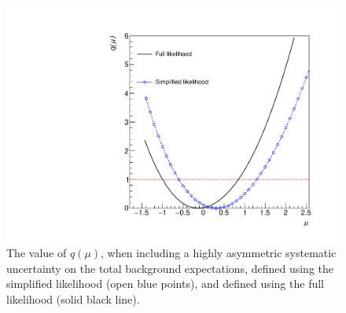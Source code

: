 \begin{figure}[hbt]
  \begin{center} 
   \includegraphics[width=1.5\cmsFigWidth]{figures/r_asymm.pdf}
   \caption{The value of $q(\mu)$, when including a highly asymmetric systematic uncertainty on the total background expectations, defined 
   using the simplified likelihood (open blue points), and defined using the full likelihood (solid black line).}
   \label{fig:likelihoodscan_asymm} 
  \end{center}
\end{figure}
